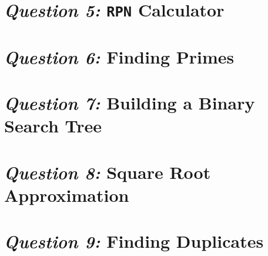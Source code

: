 \documentclass[12pt]{article}
\begin{document}
\section{\textit{Question 5:} \texttt{RPN} Calculator}







\section{\textit{Question 6:} Finding Primes}







\section{\textit{Question 7:} Building a Binary Search Tree}







\section{\textit{Question 8:} Square Root Approximation}







\section{\textit{Question 9:} Finding Duplicates}
\end{document}
